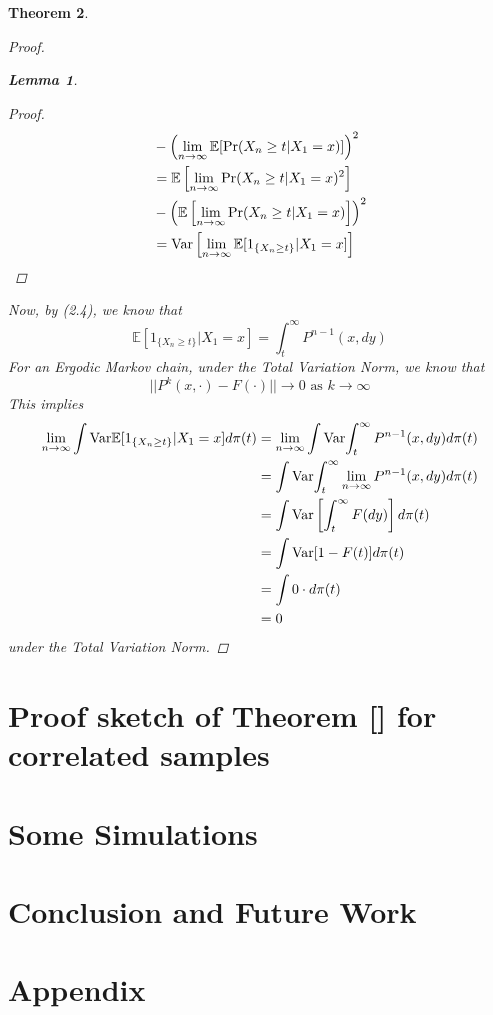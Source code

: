 \documentclass{article}
\newtheorem{theorem}{Theorem}[section]
\newtheorem{lemma}[theorem]{Lemma}
\begin{document}
\begin{theorem}
\begin{proof}
\begin{lemma}
\begin{proof}
\begin{align*}
						&- \left(\lim_{n \rightarrow \infty} \mathbb{E}[\Pr(X_{n} \geq t | X_{1} = x)]\right)^2\\
						&= \mathbb{E}\left[\lim_{n \rightarrow \infty} \Pr(X_{n} \geq t | X_{1} = x)^2\right]\\
						&- \left(\mathbb{E}\left[\lim_{n \rightarrow \infty}\Pr(X_{n} \geq t | X_{1} = x)\right]\right)^2\\
						&= \text{Var}\left[\lim_{n \rightarrow \infty} \mathbb{E}[1_{\{X_{n} \geq t\}}|X_1=x]\right]
					\end{align*}
				\end{proof}
			\end{lemma}
			Now, by (2.4), we know that
			\begin{equation*}
				\mathbb{E}[1_{\{X_{n} \geq t\}}|X_1=x] = \int_t^{\infty} P^{n-1}(x, dy)
			\end{equation*}
			For an Ergodic Markov chain, under the Total Variation Norm, we know that
			\begin{equation*}
				||P^k(x, \cdot) - F(\cdot)|| \rightarrow 0 \text{ as } k \rightarrow \infty
			\end{equation*}
			This implies
			\begin{align*}
				\lim_{n \rightarrow \infty} \int \text{Var}{\mathbb{E}[1_{\{X_{n} \geq t\}}|X_1=x]} d\pi(t) &= \lim_{n \rightarrow \infty} \int \text{Var}{\int_t^{\infty} P^{n-1}(x, dy)} d\pi(t)\\
				&= \int \text{Var}{\int_t^{\infty} \lim_{n \rightarrow \infty} P^{n-1}(x, dy)} d\pi(t)\\
				&= \int \text{Var}\left[\int_t^{\infty} F(dy)\right] d\pi(t)\\
				&= \int \text{Var}[1-F(t)] d\pi(t)\\
				&= \int 0 \cdot d\pi(t)\\
				&= 0
			\end{align*}
			under the Total Variation Norm.
		\end{proof}
	\end{theorem}


\section{Proof sketch of Theorem [] for correlated samples}

\section{Some Simulations}

\section{Conclusion and Future Work}




\section{Appendix}
\end{document}
